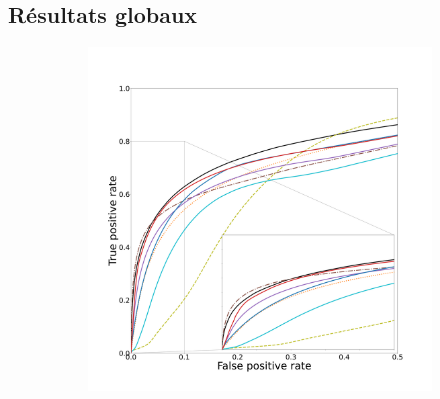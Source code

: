 \subsection{Résultats globaux}
\begin{figure}[!ht]
  \begin{subfigure}[t]{0.78\textwidth}
    \includegraphics[width=\textwidth,clip = true, trim  =  125 125 180 200]{Images/Ircad_ROC.pdf}  
  \end{subfigure}
  \begin{subfigure}[t]{0.2\textwidth}

\end{subfigure}
\end{figure}
